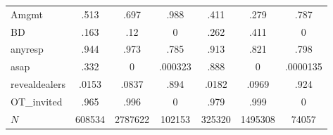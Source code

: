 \begin{tabular}{l*{6}{c}}
Amgmt                         &         .513&         .697&         .988&         .411&         .279&         .787\\
BD                            &         .163&          .12&            0&         .262&         .411&            0\\
anyresp                       &         .944&         .973&         .785&         .913&         .821&         .798\\
asap                          &         .332&            0&      .000323&         .888&            0&     .0000135\\
revealdealers                 &        .0153&        .0837&         .894&        .0182&        .0969&         .924\\
OT\_invited                    &         .965&         .996&            0&         .979&         .999&            0\\
\(N\)                         &       608534&      2787622&       102153&       325320&      1495308&        74057\\
\end{tabular}
